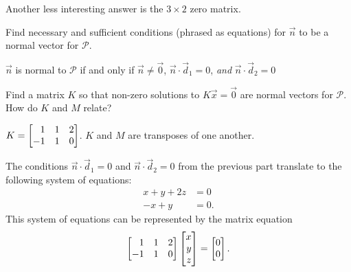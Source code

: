 \documentclass{workbook}
\begin{document}
\begin{slide}
\begin{parts}
\begin{solution}
				Another less interesting answer is the $3\times2$ zero matrix.
			\end{solution}
		\item Find necessary and sufficient conditions (phrased as equations) for
			$\vec n$ to be a normal vector for $\mathcal P$.
			\begin{solution}
				$\vec n$ is normal to $\mathcal P$ if and only if $\vec n\neq \vec 0$,
				$\vec n\cdot\vec d_1=0$, \emph{and} $\vec n\cdot\vec d_2=0$
			\end{solution}
		\item Find a matrix $K$ so that non-zero solutions to $K\vec x=\vec 0$ are normal
			vectors for $\mathcal P$. How do $K$ and $M$ relate?
			\begin{solution}
				$K = \mat{1&1&2\\-1&1&0}$. $K$ and $M$ are transposes of
				one another.

				The conditions $\vec n\cdot\vec d_1=0$ and $\vec n\cdot\vec d_2=0$
				from the previous part translate to the following system of equations:
				\begin{align*}
					x + y + 2z &= 0 \\
					-x + y &= 0.
				\end{align*}
				This system of equations can be represented by the matrix equation
				\[
					\mat{1&1&2\\-1&1&0}\mat{x\\y\\z} = \mat{0\\0}.
				\]
			\end{solution}
	\end{parts}

\end{slide}
\end{document}

